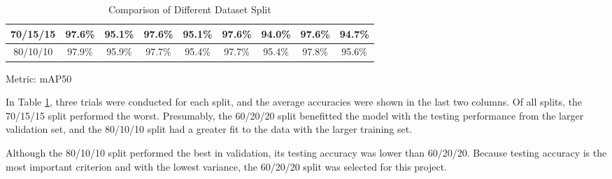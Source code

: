 \begin{table}[h]
\begin{adjustbox}{max width=\textwidth}
\begin{tabular}{|c|cc|cc|cc|cc|}
70/15/15                        & \multicolumn{1}{c|}{97.6\%}                                                        & 95.1\%                                                  & \multicolumn{1}{c|}{97.6\%}                                                        & 95.1\%                                                  & \multicolumn{1}{c|}{97.6\%}                                                        & 94.0\%                                                  & \multicolumn{1}{c|}{97.6\%}                                                        & 94.7\%                                                  \\ \hline
80/10/10                        & \multicolumn{1}{c|}{97.9\%}                                                        & 95.9\%                                                  & \multicolumn{1}{c|}{97.7\%}                                                        & 95.4\%                                                  & \multicolumn{1}{c|}{97.7\%}                                                        & 95.4\%                                                  & \multicolumn{1}{c|}{97.8\%}                                                        & 95.6\%                                                  \\ \hline
\end{tabular}
\end{adjustbox}
\caption{Comparison of Different Dataset Split}Metric: mAP50
\label{splittable}
\end{table}

In Table \ref{splittable}, three trials were conducted for each split, and the average accuracies were shown in the last two columns. Of all splits, the 70/15/15 split performed the worst. Presumably, the 60/20/20 split benefitted the model with the testing performance from the larger validation set, and the 80/10/10 split had a greater fit to the data with the larger training set. 

Although the 80/10/10 split performed the best in validation, its testing accuracy was lower than 60/20/20. Because testing accuracy is the most important criterion and with the lowest variance, the 60/20/20 split was selected for this project. 

